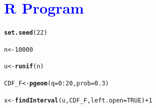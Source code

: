 \documentclass[11pt, a4paper]{article}\usepackage[]{graphicx}\usepackage[]{xcolor}
\makeatletter
\newcommand{\hlnum}[1]{\textcolor[rgb]{0.686,0.059,0.569}{#1}}%
\newcommand{\hlopt}[1]{\textcolor[rgb]{0,0,0}{#1}}%
\newcommand{\hldef}[1]{\textcolor[rgb]{0.345,0.345,0.345}{#1}}%
\newcommand{\hlkwb}[1]{\textcolor[rgb]{0.69,0.353,0.396}{#1}}%
\newcommand{\hlkwc}[1]{\textcolor[rgb]{0.333,0.667,0.333}{#1}}%
\newcommand{\hlkwd}[1]{\textcolor[rgb]{0.737,0.353,0.396}{\textbf{#1}}}%
\newenvironment{kframe}{%
 \def\at@end@of@kframe{}%
 \ifinner\ifhmode%
  \def\at@end@of@kframe{\end{minipage}}%
  \begin{minipage}{\columnwidth}%
 \fi\fi%
 \def\FrameCommand##1{\hskip\@totalleftmargin \hskip-\fboxsep
 \colorbox{shadecolor}{##1}\hskip-\fboxsep
     \hskip-\linewidth \hskip-\@totalleftmargin \hskip\columnwidth}%
 \MakeFramed {\advance\hsize-\width
   \@totalleftmargin\z@ \linewidth\hsize
   \@setminipage}}%
 {\par\unskip\endMakeFramed%
 \at@end@of@kframe}
\newenvironment{knitrout}{}{} %
\makeatother
\begin{document}
\section*{\faArrowAltCircleRight[regular] \textcolor{blue}{R Program}}



\begin{knitrout}
\color{fgcolor}\begin{kframe}
\begin{alltt}
\hlkwd{set.seed}\hldef{(}\hlnum{22}\hldef{)}
\end{alltt}
\end{kframe}
\end{knitrout}


\begin{knitrout}
\color{fgcolor}\begin{kframe}
\begin{alltt}
\hldef{n} \hlkwb{<-} \hlnum{10000}
\end{alltt}
\end{kframe}
\end{knitrout}

\begin{knitrout}
\color{fgcolor}\begin{kframe}
\begin{alltt}
\hldef{u} \hlkwb{<-} \hlkwd{runif}\hldef{(n)}
\end{alltt}
\end{kframe}
\end{knitrout}

\begin{knitrout}
\color{fgcolor}\begin{kframe}
\begin{alltt}
\hldef{CDF_F} \hlkwb{<-} \hlkwd{pgeom}\hldef{(}\hlkwc{q} \hldef{=} \hlnum{0}\hlopt{:}\hlnum{20}\hldef{,} \hlkwc{prob} \hldef{=} \hlnum{0.3}\hldef{)}
\end{alltt}
\end{kframe}
\end{knitrout}

\begin{knitrout}
\color{fgcolor}\begin{kframe}
\begin{alltt}
\hldef{x} \hlkwb{<-} \hlkwd{findInterval}\hldef{(u, CDF_F,} \hlkwc{left.open} \hldef{=} \hlnum{TRUE}\hldef{)} \hlopt{+} \hlnum{1}
\end{alltt}
\end{kframe}
\end{knitrout}
\end{document}
